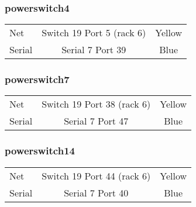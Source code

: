 \subsubsection{powerswitch4}
\begin{table}[H]
\begin{tabular}{|l|c|c|}\hline
Net & Switch 19 Port 5 (rack 6) & Yellow \\
Serial & Serial 7 Port 39 & Blue \\ \hline
\end{tabular}
\end{table}

\subsubsection{powerswitch7}
\begin{table}[H]
\begin{tabular}{|l|c|c|}\hline
Net & Switch 19 Port 38 (rack 6) & Yellow \\
Serial & Serial 7 Port 47 & Blue \\ \hline
\end{tabular}
\end{table}


\subsubsection{powerswitch14}
\begin{table}[H]
\begin{tabular}{|l|c|c|}\hline
Net & Switch 19 Port 44 (rack 6) & Yellow \\
Serial & Serial 7 Port 40 & Blue \\ \hline
\end{tabular}
\end{table}

